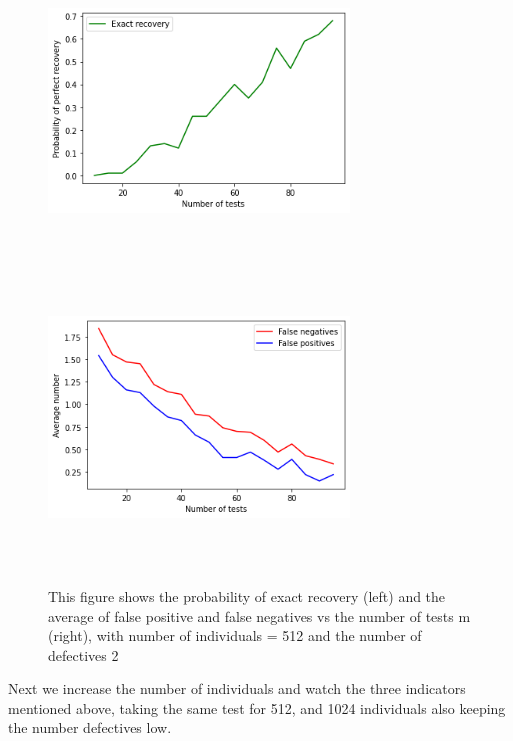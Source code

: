 \begin{figure}[H]\label{exat}
	\includegraphics[height=8cm, width=8cm]{images/index1}
	\includegraphics[height=8cm, width=8cm]{images/index}
	\caption{This figure shows the probability of exact recovery (left) and  the average of false positive and false negatives vs the number of tests m (right), with number of individuals  = 512 and the number of defectives 2}
\end{figure}


Next we increase the number of individuals and watch the three indicators mentioned above, taking the same test for 512, and 1024 individuals also keeping the number defectives low. 


